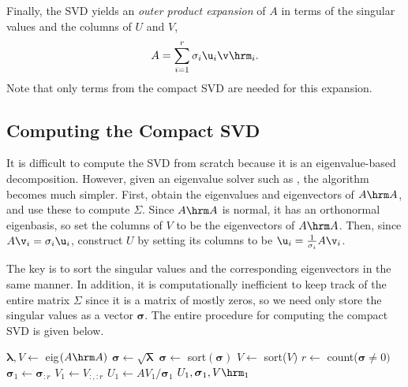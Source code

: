 Finally, the SVD yields an \emph{outer product expansion} of $A$ in terms of the singular values and the columns of $U$ and $V$,
\begin{equation}
\label{eq:svd-outer-product}
A = \sum_{i=1}^r \sigma_i\u_i\v\hrm_i.
\end{equation}
Note that only terms from the compact SVD are needed for this expansion.

\subsection*{Computing the Compact SVD} %

It is difficult to compute the SVD from scratch because it is an eigenvalue-based decomposition.
However, given an eigenvalue solver such as , the algorithm becomes much simpler.
First, obtain the eigenvalues and eigenvectors of $A\hrm A$, and use these to compute $\Sigma$.
Since $A\hrm A$ is normal, it has an orthonormal eigenbasis, so set the columns of $V$ to be the eigenvectors of $A\hrm A$.
Then, since $A\v_i = \sigma_i \u_i$, construct $U$ by setting its columns to be $\u_i = \frac{1}{\sigma_i}A\v_i$.

The key is to sort the singular values and the corresponding eigenvectors in the same manner.
In addition, it is computationally inefficient to keep track of the entire matrix $\Sigma$ since it is a matrix of mostly zeros, so we need only store the singular values as a vector $\boldsymbol{\sigma}$.
The entire procedure for computing the compact SVD is given below.

\begin{algorithm} %
\begin{algorithmic}[1]
\State $\boldsymbol{\lambda}, V \gets$ eig$(A\hrm A)$
\State $\boldsymbol{\sigma} \gets \sqrt{\boldsymbol{\lambda}}$
\State $\boldsymbol{\sigma} \gets$ sort$(\boldsymbol{\sigma})$
    \label{step:sort-singular-values}
\State $V \gets$ sort($V$)
\State $r \gets $ count($\boldsymbol{\sigma} \ne 0)$
    \label{step:nonzero-singular-values}
\State $\boldsymbol{\sigma}_1 \gets \boldsymbol{\sigma}_{:r}$
\State $V_1 \gets V_{:,:r}$
\State $U_1 \gets AV_1 / \boldsymbol{\sigma}_1$
    \label{step:SVD-construct-U}
\State {} $U_1, \boldsymbol{\sigma}_1, V\hrm_1$
\EndProcedure
\caption{}
\label{alg:compact-svd}
\end{algorithmic}
\end{algorithm}

